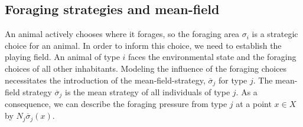 \subsection{Foraging strategies and mean-field}
An animal actively chooses where it forages, so the foraging area $\sigma_i$ is a strategic choice for an animal. In order to inform this choice, we need to establish the playing field. An animal of type $i$ faces the environmental state and the foraging choices of all other inhabitants. Modeling the influence of the foraging choices necessitates the introduction of the mean-field-strategy, $\overbar{\sigma}_j$ for type $j$. The mean-field strategy $\overbar{\sigma}_j$ is the mean strategy of all individuals of type $j$. As a consequence, we can describe the foraging pressure from type $j$ at a point $x\in X$ by $N_j \overbar{\sigma}_j(x)$. 


